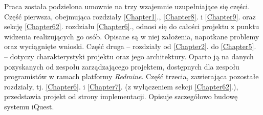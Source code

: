 Praca została podzielona umownie na trzy wzajemnie uzupełniające się części. Część pierwsza, obejmująca rozdziały \ref{Chapter1}., \ref{Chapter8}. i \ref{Chapter9}. oraz sekcję \ref{Chapter62}. rozdziału \ref{Chapter6}., odnosi się do całości projektu z punktu widzenia realizujących go osób. Opisane są w niej założenia, napotkane problemy oraz wyciągnięte wnioski. Część druga -- rozdziały od \ref{Chapter2}. do \ref{Chapter5}. -- dotyczy charakterystyki projektu oraz jego architektury. Oparto ją na danych pozyskanych od zespołu zarządzającego projektem\cite{Redmine:ProjDocs}, dostępnych dla zespołu programistów w ramach platformy \textit{Redmine}. Część trzecia, zawierająca pozostałe rozdziały, tj. \ref{Chapter6}. i \ref{Chapter7}. (z wyłączeniem sekcji \ref{Chapter62}.), przedstawia projekt od strony implementacji. Opisuje szczegółowo budowę systemu iQuest.